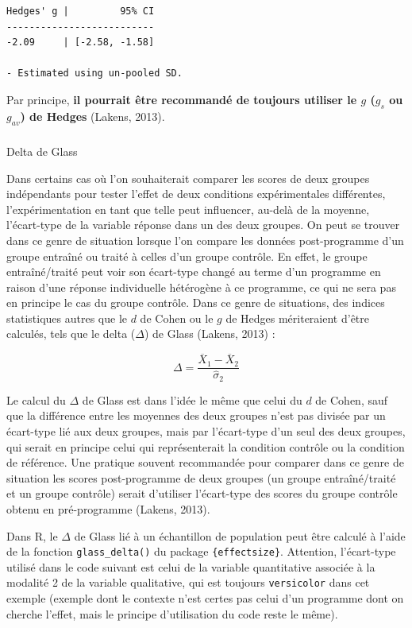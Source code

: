 \documentclass[
  letterpaper,
]{book}
\makeatletter
\let\oldsubparagraph\subparagraph
\renewcommand{\subparagraph}{
    \@ifstar
      \xxxSubParagraphStar
      \xxxSubParagraphNoStar
  }
\newcommand{\xxxSubParagraphStar}[1]{\oldsubparagraph*{#1}\mbox{}}
\newcommand{\xxxSubParagraphNoStar}[1]{\oldsubparagraph{#1}\mbox{}}
\makeatother
\begin{document}
\begin{verbatim}
Hedges' g |         95% CI
--------------------------
-2.09     | [-2.58, -1.58]

- Estimated using un-pooled SD.
\end{verbatim}

Par principe, \textbf{il pourrait être recommandé de toujours utiliser
le \(g\) (\(g_s\) ou \(g_{av}\)) de Hedges} (Lakens, 2013).

\subparagraph{Delta de Glass}\label{delta-de-glass}

Dans certains cas où l'on souhaiterait comparer les scores de deux
groupes indépendants pour tester l'effet de deux conditions
expérimentales différentes, l'expérimentation en tant que telle peut
influencer, au-delà de la moyenne, l'écart-type de la variable réponse
dans un des deux groupes. On peut se trouver dans ce genre de situation
lorsque l'on compare les données post-programme d'un groupe entraîné ou
traité à celles d'un groupe contrôle. En effet, le groupe
entraîné/traité peut voir son écart-type changé au terme d'un programme
en raison d'une réponse individuelle hétérogène à ce programme, ce qui
ne sera pas en principe le cas du groupe contrôle. Dans ce genre de
situations, des indices statistiques autres que le \(d\) de Cohen ou le
\(g\) de Hedges mériteraient d'être calculés, tels que le delta
(\(\Delta\)) de Glass (Lakens, 2013) :

\[\Delta = \frac{\overline{X}_{1} - \overline{X}_{2}} {\hat{\sigma}_{2}}\]

Le calcul du \(\Delta\) de Glass est dans l'idée le même que celui du
\(d\) de Cohen, sauf que la différence entre les moyennes des deux
groupes n'est pas divisée par un écart-type lié aux deux groupes, mais
par l'écart-type d'un seul des deux groupes, qui serait en principe
celui qui représenterait la condition contrôle ou la condition de
référence. Une pratique souvent recommandée pour comparer dans ce genre
de situation les scores post-programme de deux groupes (un groupe
entraîné/traité et un groupe contrôle) serait d'utiliser l'écart-type
des scores du groupe contrôle obtenu en pré-programme (Lakens, 2013).

Dans R, le \(\Delta\) de Glass lié à un échantillon de population peut
être calculé à l'aide de la fonction \texttt{glass\_delta()} du package
\texttt{\{effectsize\}}. Attention, l'écart-type utilisé dans le code
suivant est celui de la variable quantitative associée à la modalité 2
de la variable qualitative, qui est toujours \texttt{versicolor} dans
cet exemple (exemple dont le contexte n'est certes pas celui d'un
programme dont on cherche l'effet, mais le principe d'utilisation du
code reste le même).
\end{document}
